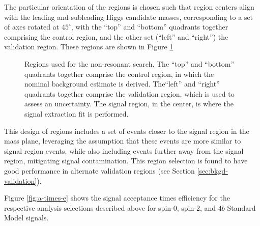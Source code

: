 The particular orientation of the regions is chosen such that region centers align with the leading
and subleading Higgs candidate masses, corresponding to a set of axes rotated at $45^{\circ}$, with the ``top''
and ``bottom'' quadrants together comprising the control region, and the other set (``left'' and ``right'')
the validation region. These regions are shown in Figure \ref{fig:nonres-regions}
\begin{figure}
\centering
{}
\caption{\label{fig:nonres-regions} Regions used for the non-resonant search. The ``top''
and ``bottom'' quadrants together comprise the control region, in which the nominal background 
estimate is derived. The``left'' and ``right'' quadrants together comprise the validation region, 
which is used to assess an uncertainty. The signal region, in the center, is where the signal extraction 
fit is performed.}
\end{figure}

This design of regions includes a set of events closer to the signal region in the mass plane, leveraging
the assumption that these events are more similar to signal region events, while also including events further away
from the signal region, mitigating signal contamination. This region selection is found to have good performance
in alternate validation regions (see Section \ref{sec:bkgd-validation}).

Figure \ref{fig:a-times-e} shows the signal acceptance times efficiency for the respective analysis selections 
described above for spin-0, spin-2, and $4b$ Standard Model signals. 

